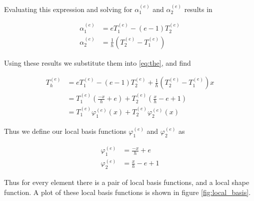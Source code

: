 \documentclass[10pt]{amsart}
\numberwithin{equation}{section}
\newenvironment{Figure}
{\par\medskip\noindent\minipage{\linewidth}}
{\endminipage\par\medskip}
\theoremstyle{definition}
\begin{document}
\begin{multicols}{2}
  Evaluating this expression and solving for $\alpha_1^{(e)}$ and
  $\alpha_2^{(e)}$ results in

  \begin{align*}
    \alpha_1^{(e)}&=eT_1^{(e)}-(e-1)T_2^{(e)}\\
    \alpha_2^{(e)}&=\frac{1}{h}\left(T_2^{(e)}-T_1^{(e)}\right)
  \end{align*}

  Using these results we substitute them into \eqref{eq:the}, and find

  \begin{align*}
    T_h^{(e)}&=eT_1^{(e)}-(e-1)T_2^{(e)}+\frac{1}{h}\left(T_2^{(e)}-T_1^{(e)}\right)x\\
             &=T_1^{(e)}\left(\frac{-x}{h}+e\right)+T_2^{(e)}\left(\frac{x}{h}-e+1\right)\\
             &=T_1^{(e)}\varphi_1^{(e)}(x)+T_2^{(e)}\varphi_2^{(e)}(x)
  \end{align*}

  Thus we define our local basis functions $\varphi_1^{(e)}$ and
  $\varphi_2^{(e)}$ as

  \begin{align}\label{eq:local_basis}
    \varphi_1^{(e)}&=\frac{-x}{h}+e\\
    \varphi_2^{(e)}&=\frac{x}{h}-e+1
  \end{align}

  Thus for every element there is a pair of local basis functions, and a local
  shape function. A plot of these local basis functions is shown in
  figure \ref{fig:local_basis}.

  \begin{Figure}
    \begin{center}
    \end{center}
    \label{fig:local_basis}
  \end{Figure}


\end{multicols}
\end{document}
